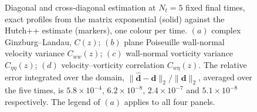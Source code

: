 \begin{figure}
    \centering
    \begin{minipage}[t]{0.49\textwidth}
        \centering
        \vspace{0pt}
    \end{minipage}\hfill
    \begin{minipage}[t]{0.49\textwidth}
        \centering
        \vspace{0pt}
    \end{minipage}

    \vspace{1em}

    \begin{minipage}[t]{0.49\textwidth}
        \centering
        \vspace{0pt}
    \end{minipage}\hfill
    \begin{minipage}[t]{0.49\textwidth}
        \centering
        \vspace{0pt}
    \end{minipage}
    \caption{Diagonal and cross-diagonal estimation at \(N_t=5\) fixed final times, exact profiles
    from the matrix exponential (solid) against the Hutch++ estimate (markers), one colour per time.
    \((a)\) complex Ginzburg--Landau, \(C(z)\); \((b)\) plane Poiseuille wall-normal velocity
    variance \(C_{ww}(z)\); \((c)\) wall-normal vorticity variance \(C_{\eta\eta}(z)\);
    \((d)\) velocity--vorticity correlation \(C_{w\eta}(z)\). The relative error integrated over the
    domain, \(\|\widehat{\mathbf{d}}-\mathbf{d}\|_{2}/\|\mathbf{d}\|_{2}\), averaged over the five
    times, is \(5.8\times10^{-4}\), \(6.2\times10^{-8}\), \(2.4\times10^{-7}\) and
    \(5.1\times10^{-8}\) respectively. The legend of \((a)\) applies to all four panels.}
    \label{fig:diag_verification}
\end{figure}
